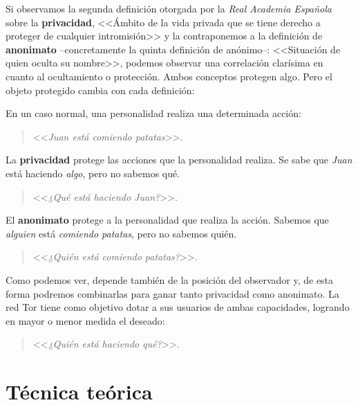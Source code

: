 \documentclass[a4paper, 11pt, titlepage]{article}
\begin{document}
        Si observamos la segunda definición otorgada por la \emph{Real Academia Española} sobre la \textbf{privacidad}, 
        <<Ámbito de la vida privada que se tiene derecho a proteger de cualquier intromisión>> y la contraponemos a la 
        definición de \textbf{anonimato} --concretamente la quinta definición de anónimo--: <<Situación de quien oculta 
        su nombre>>, podemos observar una correlación clarísima en cuanto al ocultamiento o protección. Ambos conceptos 
        protegen algo. Pero el objeto protegido cambia con cada definición:
        
        En un caso normal, una personalidad realiza una determinada acción:

        \begin{quote}
            \center <<\textit{Juan está comiendo patatas}>>.
        \end{quote}

        La \textbf{privacidad} protege las acciones que la personalidad realiza. Se sabe que \emph{Juan} está haciendo 
        \emph{algo}, pero no sabemos qué.

        \begin{quote}
            \center <<\textit{¿Qué está haciendo Juan?}>>.
        \end{quote}

        El \textbf{anonimato} protege a la personalidad que realiza la acción. Sabemos que \emph{alguien} está 
        \emph{comiendo patatas}, pero no sabemos quién.
        
        \begin{quote}
            \center <<\textit{¿Quién está comiendo patatas?}>>.
        \end{quote}

        Como podemos ver, depende también de la posición del observador y, de esta forma podremos combinarlas para ganar 
        tanto privacidad como anonimato. 
        La red Tor tiene como objetivo dotar a sus usuarios de ambas capacidades, logrando en mayor o menor medida el 
        deseado:

        \begin{quote}
            \center <<\textit{¿Quién está haciendo qué?}>>.
        \end{quote}

\section{Técnica teórica}
\end{document}
